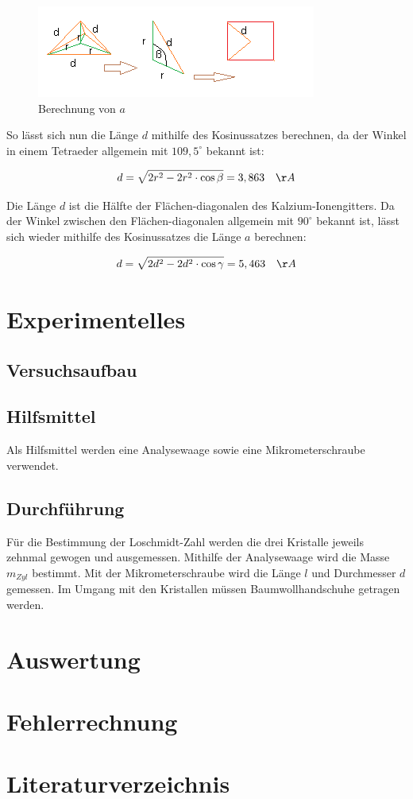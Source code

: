 \documentclass[12pt,a4paper,titlepage,headinclude,bibtotoc]{scrartcl}
\begin{document}
\begin{figure} [h]
\begin{center}
\includegraphics[scale=1]{a.png} \end{center}
\caption{Berechnung von $a$}
\end{figure} 

So lässt sich nun die Länge $d$ mithilfe des Kosinussatzes berechnen, da der Winkel in einem Tetraeder allgemein mit $109,5^\circ$ bekannt ist:

\begin{equation}
 d = \sqrt{2r^2-2r^2 \cdot \cos \beta } = 3, 863 \quad \AA
\end{equation}     

Die Länge $d$ ist die Hälfte der Flächen-diagonalen des Kalzium-Ionengitters. Da der Winkel zwischen den Flächen-diagonalen allgemein mit $ 90^\circ $ bekannt ist, lässt sich wieder mithilfe des Kosinussatzes die Länge $a$ berechnen:

\begin{equation}
 d = \sqrt{2d^2-2d^2 \cdot \cos \gamma } = 5,463 \quad \AA
\end{equation}   

\section{Experimentelles}

\subsection{Versuchsaufbau}
\subsection{Hilfsmittel}
Als Hilfsmittel werden eine Analysewaage sowie eine Mikrometerschraube verwendet.

\subsection{Durchführung}

Für die Bestimmung der Loschmidt-Zahl werden die drei Kristalle jeweils zehnmal gewogen und ausgemessen. Mithilfe der Analysewaage wird die Masse $m_{Zyl}$ bestimmt. Mit der Mikrometerschraube wird die Länge $l$ und Durchmesser $d$ gemessen. Im Umgang mit den Kristallen müssen Baumwollhandschuhe getragen werden. 

\section{Auswertung}
\section{Fehlerrechnung}
\section{Literaturverzeichnis}
\end{document}
